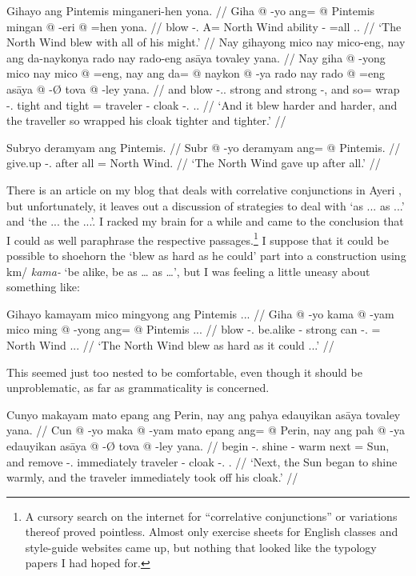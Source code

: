 \documentclass[12pt,paper=a4]{scrartcl}
\newcommand{\xayr}[3]{{\Tagati #1} \emph{#2} \enquote*{#3}}
\begin{document}
\pex %
\a \begingl
	\glpreamble Gihayo ang Pintemis minganeri-hen yona. //
	\gla Giha @ -yo ang= @ Pintemis mingan @ -eri @ =hen yona. //
	\glb blow -\Tsg{}.\N{} A= {North Wind} ability -\Ins{} =all \Tsg{}.\N{}. //
	\glft `The North Wind blew with all of his might.' //
\endgl
\a \begingl
	\glpreamble Nay gihayong mico nay mico-eng, nay ang da-naykonya rado nay rado-eng asāya tovaley yana. //
	\gla Nay giha @ -yong mico nay mico @ =eng, nay ang da= @ naykon @ -ya rado nay rado @ =eng asāya @ -Ø tova @ -ley yana. //
	\glb and blow -\Tsg.\N{}.\Aarg{} strong and strong -\Comp{}, and \AgtT{} so= wrap -\Tsg{}.\M{} tight and tight =\Comp{} traveler -\Top{} cloak -\Parg{}.\Inan{} \Tsg{}.\Gen{}. //
	\glft `And it blew harder and harder, and the traveller so wrapped his cloak tighter and tighter.' //
\endgl

\a \begingl
	\glpreamble Subryo deramyam ang Pintemis. //
	\gla Subr @ -yo deramyam ang= @ Pintemis. //
	\glb give.up -\Tsg{}.\N{} {after all} \Aarg{}= {North Wind}. //
	\glft `The North Wind gave up after all.' //
\endgl
\xe

There is an article on my blog that deals with correlative conjunctions in Ayeri \autocite{becker2012}, but unfortunately, it leaves out a discussion of strategies to deal with `as ... as ...' and `the ... the ...'. I racked my brain for a while and came to the conclusion that I could as well paraphrase the respective passages.\footnote{A cursory search on the internet for \enquote{correlative conjunctions} or variations thereof proved pointless. Almost only exercise sheets for English classes and style-guide websites came up, but nothing that looked like the typology papers I had hoped for.} I suppose that it could be possible to shoehorn the `blew as hard as he could' part into a construction using \xayr{km/}{kama-}{be alike, be as … as …}, but I was feeling a little uneasy about something like:

\ex[exno=iii]
\begingl
	\glpreamble Gihayo kamayam mico mingyong ang Pintemis ... //
	\gla Giha @ -yo kama @ -yam mico ming @ -yong ang= @ Pintemis ... //
	\glb blow -\Tsg{}.\N{} be.alike -\Ptcp{} strong can -\Tsg{}.\N{} \Aarg{}= {North Wind} ... //
	\glft `The North Wind blew as hard as it could ...' //
\endgl
\xe

This seemed just too nested to be comfortable, even though it should be unproblematic, as far as grammaticality is concerned.

\ex %
\begingl
	\glpreamble Cunyo makayam mato epang ang Perin, nay ang pahya edauyikan asāya tovaley yana. //
	\gla Cun @ -yo maka @ -yam mato epang ang= @ Perin, nay ang pah @ -ya edauyikan asāya @ -Ø tova @ -ley yana. //
	\glb begin -\Tsg{}.\N{} shine -\Ptcp{} warm next \Aarg{}= Sun, and \AgtT{} remove -\Tsg{}.\M{} immediately traveler -\Top{} cloak -\Parg{}.\Inan{} \Tsg{}.\Gen{} //
	\glft `Next, the Sun began to shine warmly, and the traveler immediately took off his cloak.' //
\endgl
\xe
\end{document}
